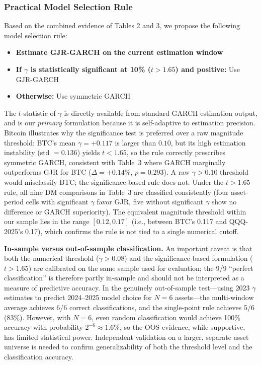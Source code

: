 \subsubsection{Practical Model Selection Rule}

Based on the combined evidence of Tables 2 and 3, we propose the following model selection rule:
\begin{itemize}
\item \textbf{Estimate GJR-GARCH on the current estimation window}
\item \textbf{If $\gamma$ is statistically significant at 10\% ($t > 1.65$) and positive:} Use GJR-GARCH
\item \textbf{Otherwise:} Use symmetric GARCH
\end{itemize}
The $t$-statistic of $\gamma$ is directly available from standard GARCH estimation output, and is our \emph{primary} formulation because it is self-adaptive to estimation precision. Bitcoin illustrates why the significance test is preferred over a raw magnitude threshold: BTC's mean $\gamma = +0.117$ is larger than $0.10$, but its high estimation instability (std $= 0.136$) yields $t < 1.65$, so the rule correctly prescribes symmetric GARCH, consistent with Table~3 where GARCH marginally outperforms GJR for BTC ($\Delta = +0.14\%$, $p = 0.293$). A raw $\gamma > 0.10$ threshold would misclassify BTC; the significance-based rule does not. Under the $t > 1.65$ rule, all nine DM comparisons in Table~3 are classified consistently (four asset-period cells with significant $\gamma$ favor GJR, five without significant $\gamma$ show no difference or GARCH superiority). The equivalent magnitude threshold within our sample lies in the range $[0.12, 0.17]$ (i.e., between BTC's 0.117 and QQQ-2025's 0.17), which confirms the rule is not tied to a single numerical cutoff.

\textbf{In-sample versus out-of-sample classification.} An important caveat is that both the numerical threshold ($\gamma > 0.08$) and the significance-based formulation ($t > 1.65$) are calibrated on the same sample used for evaluation; the 9/9 ``perfect classification'' is therefore partly in-sample and should not be interpreted as a measure of predictive accuracy. In the genuinely out-of-sample test---using 2023 $\gamma$ estimates to predict 2024--2025 model choice for $N = 6$ assets---the multi-window average achieves 6/6 correct classifications, and the single-point rule achieves 5/6 (83\%). However, with $N = 6$, even random classification would achieve 100\% accuracy with probability $2^{-6} \approx 1.6\%$, so the OOS evidence, while supportive, has limited statistical power. Independent validation on a larger, separate asset universe is needed to confirm generalizability of both the threshold level and the classification accuracy.

